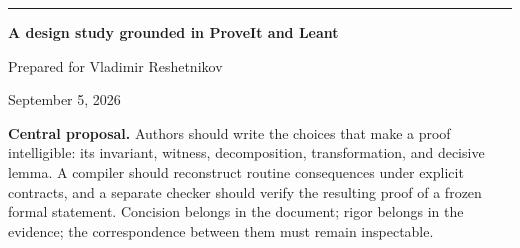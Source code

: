 \documentclass[11pt,letterpaper]{article}
\theoremstyle{remark}
\begin{document}
\begin{titlepage}
\vspace*{0.5in}
\par
\vspace{0.35in}
\par
\vspace{0.12in}
\par
\vspace{0.4in}
\par
\vspace{0.4in}
\noindent\rule{\linewidth}{0.6pt}\par
\vspace{0.15in}
\noindent\textbf{A design study grounded in ProveIt and Leant}\par
\noindent Prepared for Vladimir Reshetnikov\par
\noindent September 5, 2026\par
\vfill
\noindent\begin{minipage}{0.95\linewidth}
\raggedright
\textbf{Central proposal.} Authors should write the choices that make a proof intelligible: its invariant, witness, decomposition, transformation, and decisive lemma. A compiler should reconstruct routine consequences under explicit contracts, and a separate checker should verify the resulting proof of a frozen formal statement. Concision belongs in the document; rigor belongs in the evidence; the correspondence between them must remain inspectable.
\end{minipage}\par
\vspace{0.3in}
\par
\end{titlepage}
\end{document}
